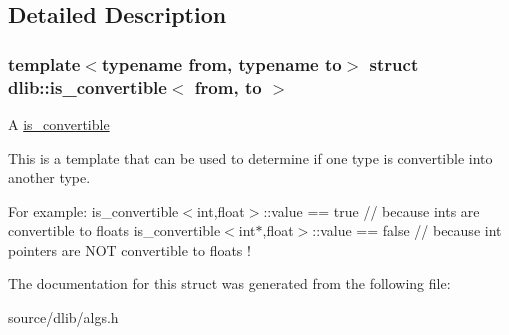 \subsection{Detailed Description}
\subsubsection*{template$<$typename from, typename to$>$ struct dlib::is\_\-convertible$<$ from, to $>$}

A \hyperlink{structdlib_1_1is__convertible}{is\_\-convertible}

This is a template that can be used to determine if one type is convertible into another type.

For example: is\_\-convertible$<$int,float$>$::value == true // because ints are convertible to floats is\_\-convertible$<$int$\ast$,float$>$::value == false // because int pointers are NOT convertible to floats ! 

The documentation for this struct was generated from the following file:\begin{DoxyCompactItemize}
\item 
source/dlib/algs.h\end{DoxyCompactItemize}
